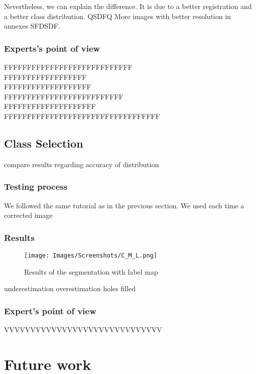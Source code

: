 %
\par
%
\par
Nevertheless, we can explain the difference. It is due to a better registration and a better class distribution. QSDFQ
More images with better resolution in annexes SFDSDF.

%
\subsubsection{Experts's point of view}
%
FFFFFFFFFFFFFFFFFFFFFFFFFFFF\\FFFFFFFFFFFFFFFFFF\\FFFFFFFFFFFFFFFFFFF\\FFFFFFFFFFFFFFFFFFFFFFFFFF\\FFFFFFFFFFFFFFFFFFFF\\FFFFFFFFFFFFFFFFFFFFFFFFFFFFFFFFFF
%
\subsection{Class Selection}
compare results regarding accuracy of distribution
%
\subsubsection{Testing process}
We followed the same tutorial as in the previous section. We used each time a corrected image
%
\subsubsection{Results}

  \begin{figure}\centering
  \texttt{[image: Images/Screenshots/C\_M\_L.png]}
  \caption{Results of the segmentation with label map}\label{fig:C_M_L}
  \end{figure}
  
underestimation
overestimation
holes filled

%
\subsubsection{Expert's point of view}
%
VVVVVVVVVVVVVVVVVVVVVVVVVVVVVV

\section{Future work}

